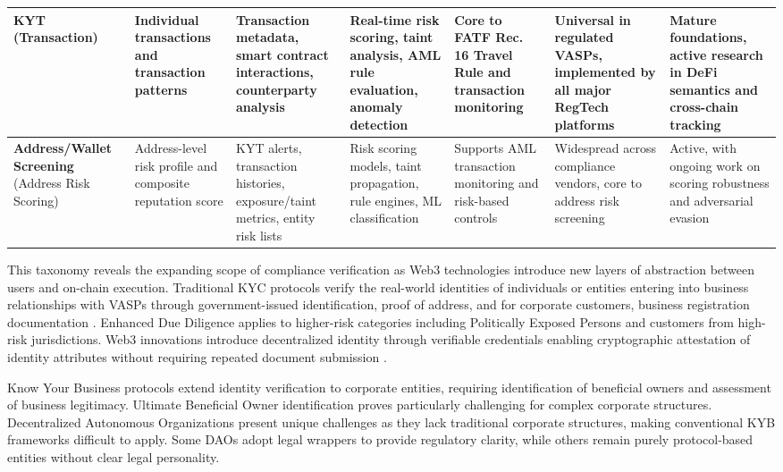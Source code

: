 \begin{table}[t]
\begin{tabularx}{\textwidth}{XXXXp{2.35cm}XX}
\midrule
\textbf{KYT} (Transaction) & Individual transactions and transaction patterns \cite{moser2013inquirymoneylaundering} & Transaction metadata, smart contract interactions, counterparty analysis \cite{chen2020understandingethereumgraph} & Real-time risk scoring, taint analysis, AML rule evaluation, anomaly detection \cite{moser2014riskscoringbitcoin,monamo2016unsupervisedlearningrobust} & Core to FATF Rec. 16 Travel Rule and transaction monitoring \cite{force2021opportunitieschallengesnew} & Universal in regulated VASPs, implemented by all major RegTech platforms & Mature foundations, active research in DeFi semantics and cross-chain tracking \cite{sun2025ethereumfrauddetection,yousaf2019tracingtransactionscryptocurrency} \\
\midrule
\textbf{Address/Wallet Screening} (Address Risk Scoring) & Address-level risk profile and composite reputation score & KYT alerts, transaction histories, exposure/taint metrics, entity risk lists & Risk scoring models, taint propagation, rule engines, ML classification \cite{moser2014riskscoringbitcoin,weber2019antimoneylaunderingbitcoin} & Supports AML transaction monitoring and risk-based controls & Widespread across compliance vendors, core to address risk screening & Active, with ongoing work on scoring robustness and adversarial evasion \cite{pocher2023detectinganomalouscryptocurrency,alarab2020comparativeanalysisusing} \\
\bottomrule
\end{tabularx}
\end{table}

This taxonomy reveals the expanding scope of compliance verification as Web3 technologies introduce new layers of abstraction between users and on-chain execution. Traditional KYC protocols verify the real-world identities of individuals or entities entering into business relationships with VASPs through government-issued identification, proof of address, and for corporate customers, business registration documentation \cite{financialactiontaskforcefatf2012internationalstandardscombating}. Enhanced Due Diligence applies to higher-risk categories including Politically Exposed Persons and customers from high-risk jurisdictions. Web3 innovations introduce decentralized identity through verifiable credentials enabling cryptographic attestation of identity attributes without requiring repeated document submission \cite{reed2022decentralizedidentifiersdids,camenisch2001efficientsystemnontransferable}.

Know Your Business protocols extend identity verification to corporate entities, requiring identification of beneficial owners and assessment of business legitimacy. Ultimate Beneficial Owner identification proves particularly challenging for complex corporate structures. Decentralized Autonomous Organizations present unique challenges as they lack traditional corporate structures, making conventional KYB frameworks difficult to apply. Some DAOs adopt legal wrappers to provide regulatory clarity, while others remain purely protocol-based entities without clear legal personality.

